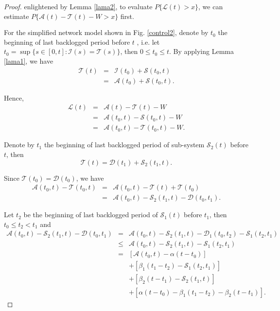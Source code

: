 \documentclass[12pt]{article}
\newtheorem{proof}{Proof}
\begin{document}
\begin{proof}
enlightened by Lemma \ref{lama2}, to evaluate $P\{\mathcal{L}(t)>x\}$, we can estimate $P\{\mathcal{A}(t)-\mathcal{T}(t)-W>x\}$ first.

For the simplified network model shown in Fig. \ref{control2}, denote by $t_{0}$ the beginning of last backlogged period before $t$ \cite{Fidl06}, i.e. let $t_0=\sup\{s\in[0,t]:\mathcal{I}(s)=\mathcal{T}(s)\}$, then $0\leq t_{0}\leq t$. By applying Lemma \ref{lama1}, we have
\begin{eqnarray*}
  \mathcal{T}(t)&=&\mathcal{I}(t_{0})+\mathcal{S}(t_{0},t)\\
  &=& \mathcal{A}(t_{0})+\mathcal{S}(t_{0},t).
\end{eqnarray*}

Hence,
\begin{eqnarray}
\mathcal{L}(t)&=&\mathcal{A}(t)-\mathcal{T}(t)-W\nonumber\\
&=&\mathcal{A}(t_0,t)-\mathcal{S}(t_0,t)-W\label{used4theorem5}\\
&=&\mathcal{A}(t_0,t)-\mathcal{T}(t_0,t)-W\nonumber.
\end{eqnarray}

Denote by $t_1$ the beginning of last backlogged period of sub-system $\mathcal{S}_2(t)$ before $t$, then
$$\mathcal{T}(t)=\mathcal{D}(t_1)+\mathcal{S}_2(t_1,t).$$

Since $\mathcal{T}(t_0)=\mathcal{D}(t_0)$, we have
\begin{eqnarray*}
\mathcal{A}(t_0,t)-\mathcal{T}(t_0,t) &=& \mathcal{A}(t_0,t)-\mathcal{T}(t)+\mathcal{T}(t_0)\\
&=& \mathcal{A}(t_0,t)-\mathcal{S}_2(t_1,t)-\mathcal{D}(t_0,t_1).
\end{eqnarray*}

Let $t_2$ be the beginning of last backlogged period of $\mathcal{S}_1(t)$ before $t_1$, then $t_0\leq t_2< t_1$ and
\begin{eqnarray}
\mathcal{A}(t_0,t)-\mathcal{S}_2(t_1,t)-\mathcal{D}(t_0,t_1) &=& \mathcal{A}(t_0,t)-\mathcal{S}_2(t_1,t)-\mathcal{D}_1(t_0,t_2)-\mathcal{S}_1(t_2,t_1)\nonumber\\
&\leq& \mathcal{A}(t_0,t)-\mathcal{S}_2(t_1,t)-\mathcal{S}_1(t_2,t_1)\label{used4effec}\\
&=& [\mathcal{A}(t_0,t)-\alpha(t-t_0)]\nonumber\\
&& +[\beta_1(t_1-t_2)-\mathcal{S}_1(t_2,t_1)]\nonumber\\
&& +[\beta_2(t-t_1)-\mathcal{S}_2(t_1,t)]\nonumber\\
&& +[\alpha(t-t_0)-\beta_1(t_1-t_2)-\beta_2(t-t_1)].\label{initial}
\end{eqnarray}


\end{proof}
\end{document}

